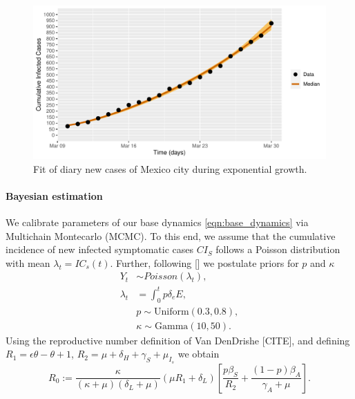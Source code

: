 \begin{figure}[htb]
    \centering
    \includegraphics[scale=0.7, keepaspectratio]{./cdmx_CIs_data_begining_fit}
    \caption{%
        Fit of diary new cases of Mexico city
        during exponential growth.
    }
    \label{fig:data_CDMX_fitting}
\end{figure}
%

\paragraph{Bayesian estimation}
We calibrate parameters of our base dynamics 
\eqref{eqn:base_dynamics} via Multichain Montecarlo (MCMC).
To this end, we assume that the cumulative
incidence of new infected symptomatic cases $CI_S$
follows a Poisson distribution with mean $\lambda_t = IC_s(t)$. Further,
following [] we postulate priors for $p$ and $\kappa$
\begin{equation}
    \label{eqn:boservation_model}
    \begin{aligned}
        Y_t & \sim Poisson(\lambda_t),
        \\
        \lambda_t
        &=
        \int_{0}^t p \delta_e E ,
        \\
        & p \sim \text{Uniform} (0.3, 0.8),
        \\
        & \kappa \sim \text{Gamma}(10, 50).
    \end{aligned}
\end{equation}
%
\textbf{}
Using the reproductive number definition
of Van DenDrishe [CITE],
and defining $R_1 = \epsilon\theta- \theta +1$,
$R_2 = \mu + \delta_H+\gamma_S+\mu_{I_{s}}$
we obtain
\begin{equation*}
    \label{eqn:reproductive_number}
    R_0 :=
  \frac{\kappa}{(\kappa+\mu)(\delta_L+\mu)}\left(\mu R_1+\delta_L\right)
  \left[\frac{p\beta_S}{R_2}
  +\frac{(1-p)\beta_A}{\gamma_A+\mu}\right].
\end{equation*}

